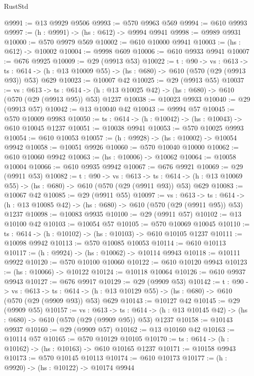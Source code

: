 \begin{lexlean}{RustStd}
\begin{coremodule}
@9991 := @13 @9929 @9506
@9993 := @570 @9963 @569
@9994 := @610 @9993
@9997 := (h : @9991) -> (hs : @612) -> @9994 @9941
@9998 := @9989 @9931
@10000 := @570 @9979 @569
@10002 := @610 @10000 @9941
@10003 := (hs : @612) -> @10002
@10004 := @9998 @609
@10006 := @610 @9933 @9941
@10007 := @676 @9925
@10009 := @29 (@9913 @53)
@10022 := {t : @90} ->
  {vs : @613} ->
  {ts : @614} -> (h : @13 @10009 @55) -> (hs : @680) -> @610 (@570 (@29 (@9913 @93)) @53) @629
@10023 := @10007 @42
@10025 := @29 (@9913 @55)
@10037 := {vs : @613} ->
  {ts : @614} -> (h : @13 @10025 @42) -> (hs : @680) -> @610 (@570 (@29 (@9913 @95)) @53) @1237
@10038 := @10023 @9933
@10040 := @29 (@9913 @57)
@10042 := @13 @10040 @42
@10043 := @9994 @57
@10045 := @570 @10009 @9983
@10050 := {ts : @614} -> (h : @10042) -> (hs : @10043) -> @610 @10045 @1237
@10051 := @10038 @9941
@10053 := @570 @10025 @9993
@10054 := @610 @10053
@10057 := (h : @9928) -> (hs : @10002) -> @10054 @9942
@10058 := @10051 @9926
@10060 := @570 @10040 @10000
@10062 := @610 @10060 @9942
@10063 := (hs : @10006) -> @10062
@10064 := @10058 @10004
@10066 := @610 @9935 @9942
@10067 := @676 @9921
@10069 := @29 (@9911 @53)
@10082 := {t : @90} ->
  {vs : @613} ->
  {ts : @614} -> (h : @13 @10069 @55) -> (hs : @680) -> @610 (@570 (@29 (@9911 @93)) @53) @629
@10083 := @10067 @42
@10085 := @29 (@9911 @55)
@10097 := {vs : @613} ->
  {ts : @614} -> (h : @13 @10085 @42) -> (hs : @680) -> @610 (@570 (@29 (@9911 @95)) @53) @1237
@10098 := @10083 @9935
@10100 := @29 (@9911 @57)
@10102 := @13 @10100 @42
@10103 := @10054 @57
@10105 := @570 @10069 @10045
@10110 := {ts : @614} -> (h : @10102) -> (hs : @10103) -> @610 @10105 @1237
@10111 := @10098 @9942
@10113 := @570 @10085 @10053
@10114 := @610 @10113
@10117 := (h : @9924) -> (hs : @10062) -> @10114 @9943
@10118 := @10111 @9922
@10120 := @570 @10100 @10060
@10122 := @610 @10120 @9943
@10123 := (hs : @10066) -> @10122
@10124 := @10118 @10064
@10126 := @610 @9937 @9943
@10127 := @676 @9917
@10129 := @29 (@9909 @53)
@10142 := {t : @90} ->
  {vs : @613} ->
  {ts : @614} -> (h : @13 @10129 @55) -> (hs : @680) -> @610 (@570 (@29 (@9909 @93)) @53) @629
@10143 := @10127 @42
@10145 := @29 (@9909 @55)
@10157 := {vs : @613} ->
  {ts : @614} -> (h : @13 @10145 @42) -> (hs : @680) -> @610 (@570 (@29 (@9909 @95)) @53) @1237
@10158 := @10143 @9937
@10160 := @29 (@9909 @57)
@10162 := @13 @10160 @42
@10163 := @10114 @57
@10165 := @570 @10129 @10105
@10170 := {ts : @614} -> (h : @10162) -> (hs : @10163) -> @610 @10165 @1237
@10171 := @10158 @9943
@10173 := @570 @10145 @10113
@10174 := @610 @10173
@10177 := (h : @9920) -> (hs : @10122) -> @10174 @9944

\end{coremodule}
\end{lexlean}
